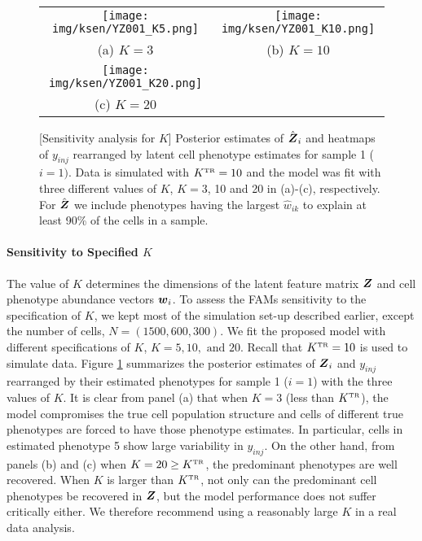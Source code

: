\documentclass[12pt,]{article}
\newcommand{\true}{{\mbox{\tiny TR}}}
\newcommand{\bZ}{\mbox{\boldmath $Z$}}
\newcommand{\bw}{\mbox{\boldmath $w$}}
\begin{document}
\begin{figure}[t]
\begin{center}
  \begin{tabular}{cc}
  \texttt{[image: img/ksen/YZ001\_K5.png]}&
  \texttt{[image: img/ksen/YZ001\_K10.png]}\\
  {\small (a) $K=3$} & {\small (b) $K=10$} \\
  \texttt{[image: img/ksen/YZ001\_K20.png]}& \\
  {\small (c) $K=20$} &\\
  \end{tabular}
  \vspace{-0.05in}
  \caption{\small[Sensitivity analysis for $K$] Posterior estimates of $\hat{\bZ}_i$ and heatmaps of $y_{inj}$ rearranged by latent cell phenotype estimates for sample 1 ($i=1)$. Data is simulated with $K^\true=10$ and the model was fit with three different values of $K$, $K=3$, 10 and 20 in (a)-(c), respectively.
  For $\hat{\bZ}$ we include phenotypes having the largest $\hat{w}_{ik}$ to
    explain at least 90\% of the cells in a sample. }
  \label{fig:ksen-post-Z}
\end{center}
\end{figure}

\paragraph*{Sensitivity to Specified $K$}
The value of $K$ determines the dimensions of the latent feature matrix $\bZ$
and cell phenotype abundance vectors $\bw_i$.  To assess the FAMs sensitivity
to the specification of $K$, we kept most of the simulation set-up described
earlier, except the number of cells, $N=(1500, 600, 300)$. We fit the proposed
model with different specifications of $K$, $K=5, 10, \text{ and } 20$. Recall
that $K^\true=10$ is used to simulate data.  Figure \ref{fig:ksen-post-Z}
summarizes the posterior estimates of $\bZ_i$ and $y_{inj}$ rearranged by their
estimated phenotypes for sample 1 ($i=1$) with the three values of $K$. It is
clear from panel (a) that when $K=3$ (less than $K^\true$), the model
compromises the true cell population structure and cells of different true
phenotypes are forced to have those phenotype estimates. In particular, cells
in estimated phenotype 5 show large variability in $y_{inj}$.  On the other
hand, from panels (b) and (c) when $K=20 \geq K^\true$, the predominant
phenotypes are well recovered. 
When $K$ is larger than $K^\true$, not only can the
predominant cell phenotypes be recovered in $\bZ$, but the model performance does
not suffer critically either. We therefore recommend using a reasonably large
$K$ in a real data analysis.
\end{document}
